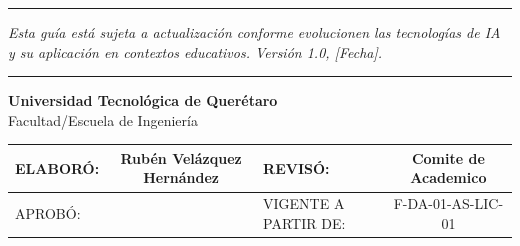 \documentclass[11pt, letterpaper]{article}
\begin{document}
	\vspace{1cm}

\rule{\textwidth}{1pt}
\begin{center}
	\textit{Esta guía está sujeta a actualización conforme evolucionen las tecnologías de IA y su aplicación en contextos educativos. Versión 1.0, [Fecha].}
	
	\vspace{0.3cm}
\end{center}
\rule{\textwidth}{1pt}

\vspace{1cm}

\begin{center}
	\textbf{Universidad Tecnológica de Querétaro}\\
	Facultad/Escuela de Ingeniería
	
	\vspace{1cm}
	
	\begin{tabular}{|p{}|p{}|p{}|p{}|}
		\hline
		ELABORÓ:   & \multicolumn{1}{|c|}{Rubén Velázquez Hernández} & REVISÓ:   & \multicolumn{1}{|c|}{ Comite de Academico} \\
		\hline
		APROBÓ: & \multicolumn{1}{|c|}{} & VIGENTE A PARTIR DE: & \multicolumn{1}{|c|}{F-DA-01-AS-LIC-01} \\
		\hline
	\end{tabular}
\end{center}
\end{document}
